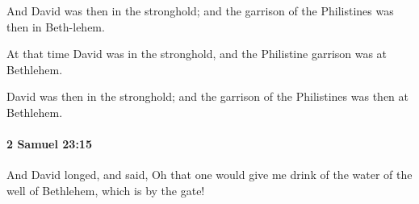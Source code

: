 			\begin{versebox}
					\item[BHS] 
					\item[ASV] And David was then in the stronghold; and the garrison of the Philistines was then in Beth-lehem.
					\item[NIV] At that time David was in the stronghold, and the Philistine garrison was at Bethlehem.
					\item[NRSV] David was then in the stronghold; and the garrison of the Philistines was then at Bethlehem.
			\end{versebox}

		\paragraph{2 Samuel 23:15} %
			\label{2SAMUEL-23-15}

			And David longed, and said, Oh that one would give me drink of the water of the well of Bethlehem, which is by the gate!


